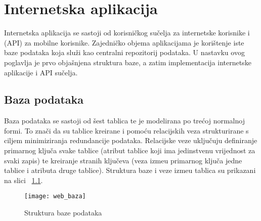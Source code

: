 \chapter{Internetska aplikacija}

Internetska aplikacija se sastoji od korisni\v{c}kog su\v{c}elja za internetske korisnike i (API) za mobilne korisnike. Zajedni\v{c}ko objema aplikacijama je kori\v{s}tenje iste baze podataka koja slu\v{z}i kao centralni repozitorij podataka. U nastavku ovog poglavlja je prvo obja\v{s}njena struktura baze, a zatim implementacija internetske aplikacije i API su\v{c}elja.

\section{Baza podataka}

Baza podataka se sastoji od \v{s}est tablica te je modelirana po tre\'{c}oj normalnoj formi. To zna\v{c}i da su tablice kreirane i pomo\'{c}u relacijskih veza strukturirane s ciljem minimiziranja redundancije podataka. Relacijske veze uklju\v{c}uju definiranje primarnog klju\v{c}a svake tablice (atribut tablice koji ima jedinstvenu vrijednost za svaki zapis) te kreiranje stranih klju\v{c}eva (veza izme\dj u primarnog klju\v{c}a jedne tablice i atributa druge tablice). Struktura baze i veze izme\dj u tablica su prikazani na slici ~\ref{fig:bazaPodataka}.


\begin{figure}[!htbp]
	\begin{center}
 \texttt{[image: web\_baza]}
 \caption{Struktura baze podataka}
 \label{fig:bazaPodataka}
	\end{center}
\end{figure}


